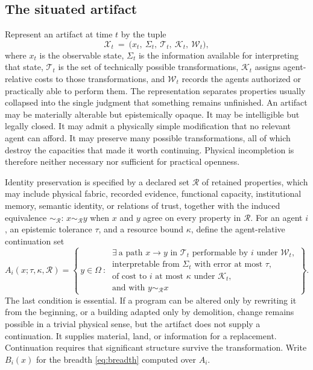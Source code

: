 \subsection{The situated artifact}

Represent an artifact at time $t$ by the tuple
\begin{equation}\label{eq:tuple}
\mathcal{X}_t\ =\ \big(x_t,\ \Sigma_t,\ \mathcal{T}_t,\ \mathcal{K}_t,\ \mathcal{W}_t\big),
\end{equation}
where $x_t$ is the observable state, $\Sigma_t$ is the information available for interpreting that state, $\mathcal{T}_t$ is the set of technically possible transformations, $\mathcal{K}_t$ assigns agent-relative costs to those transformations, and $\mathcal{W}_t$ records the agents authorized or practically able to perform them. The representation separates properties usually collapsed into the single judgment that something remains unfinished. An artifact may be materially alterable but epistemically opaque. It may be intelligible but legally closed. It may admit a physically simple modification that no relevant agent can afford. It may preserve many possible transformations, all of which destroy the capacities that made it worth continuing. Physical incompletion is therefore neither necessary nor sufficient for practical openness.

Identity preservation is specified by a declared set $\mathcal{R}$ of retained properties, which may include physical fabric, recorded evidence, functional capacity, institutional memory, semantic identity, or relations of trust, together with the induced equivalence $\sim_{\mathcal{R}}$: $x\sim_{\mathcal{R}}y$ when $x$ and $y$ agree on every property in $\mathcal{R}$. For an agent $i$, an epistemic tolerance $\tau$, and a resource bound $\kappa$, define the agent-relative continuation set
\begin{equation}\label{eq:Ai}
A_i(x;\tau,\kappa,\mathcal{R})=\left\{\,y\in\Omega\ :\
\begin{array}{l}
\exists\ \text{a path } x\to y \text{ in } \mathcal{T}_t \text{ performable by } i \text{ under } \mathcal{W}_t,\\
\text{interpretable from } \Sigma_t \text{ with error at most } \tau,\\
\text{of cost to } i \text{ at most } \kappa \text{ under } \mathcal{K}_t,\\
\text{and with } y\sim_{\mathcal{R}}x
\end{array}\right\}.
\end{equation}
The last condition is essential. If a program can be altered only by rewriting it from the beginning, or a building adapted only by demolition, change remains possible in a trivial physical sense, but the artifact does not supply a continuation. It supplies material, land, or information for a replacement. Continuation requires that significant structure survive the transformation. Write $B_i(x)$ for the breadth \eqref{eq:breadth} computed over $A_i$.

